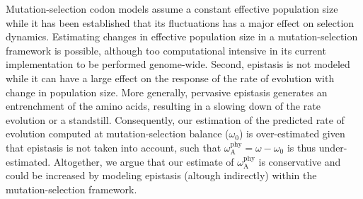 \documentclass{article}
\newcommand{\rateApop}{\omega_{\mathrm{A}}}
\newcommand{\rateAphy}{\rateApop^{\mathrm{phy}}}
\begin{document}
    Mutation-selection codon models assume a constant effective population size while it has been established that its fluctuations has a major effect on selection dynamics\cite{lanfear_population_2014, platt_protein_2018}.
    Estimating changes in effective population size in a mutation-selection framework is possible\cite{latrille_inferring_2021}, although too computational intensive in its current implementation to be performed genome-wide.
    Second, epistasis is not modeled while it can have a large effect on the response of the rate of evolution with change in population size\cite{latrille_quantifying_2021}.
    More generally, pervasive epistasis generates an entrenchment of the amino acids\cite{goldstein_evolutionary_2004, goldstein_nonadaptive_2015, goldstein_sequence_2017}, resulting in a slowing down of the rate evolution\cite{rodrigue_detecting_2017, patel_epistasis_2022} or a standstill\cite{youssef_evolution_2022}.
    Consequently, our estimation of the predicted rate of evolution computed at mutation-selection balance ($\omega_0$) is over-estimated given that epistasis is not taken into account, such that $\rateAphy = \omega - \omega_{0}$ is thus under-estimated.
    Altogether, we argue that our estimate of $\rateAphy$ is conservative and could be increased by modeling epistasis (altough indirectly) within the mutation-selection framework\cite{goldstein_sequence_2017}.
\end{document}
